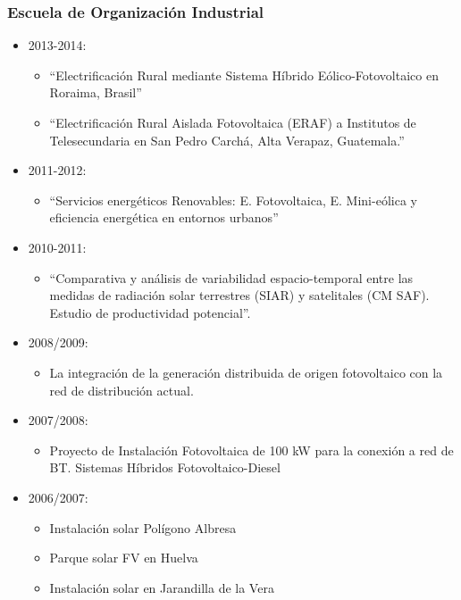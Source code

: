 \documentclass[article, a4paper]{memoir}
\begin{document}
\subsubsection{Escuela de Organización Industrial}
\label{sec:orgheadline17}
\begin{itemize}
\item 2013-2014:
\begin{itemize}
\item ``Electrificación Rural mediante Sistema Híbrido Eólico-Fotovoltaico en Roraima, Brasil''
\item ``Electrificación Rural Aislada Fotovoltaica (ERAF) a Institutos de Telesecundaria en San Pedro Carchá, Alta Verapaz, Guatemala.''
\end{itemize}
\item 2011-2012:
\begin{itemize}
\item ``Servicios energéticos Renovables: E. Fotovoltaica, E. Mini-eólica y eficiencia energética en entornos urbanos''
\end{itemize}
\item 2010-2011:
\begin{itemize}
\item ``Comparativa y análisis de variabilidad espacio-temporal entre las medidas de radiación solar terrestres (SIAR) y satelitales (CM SAF). Estudio de productividad potencial''.
\end{itemize}
\item 2008/2009:
\begin{itemize}
\item \guillemotleft{}La integración de la generación distribuida de origen fotovoltaico con la red de distribución actual.
\end{itemize}
\item 2007/2008:
\begin{itemize}
\item \guillemotleft{}Proyecto de Instalación Fotovoltaica de 100 kW para la conexión a red de BT. Sistemas Híbridos Fotovoltaico-Diesel\guillemotright{}
\end{itemize}
\item 2006/2007:
\begin{itemize}
\item \guillemotleft{}Instalación solar Polígono Albresa\guillemotright{}
\item \guillemotleft{}Parque solar FV en Huelva\guillemotright{}
\item \guillemotleft{}Instalación solar en Jarandilla de la Vera\guillemotright{}

\end{itemize}
\end{itemize}
\end{document}
